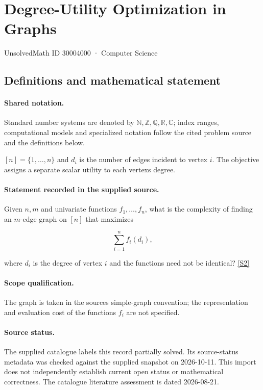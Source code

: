 \documentclass[11pt]{article}
\newcommand{\sref}[2]{\hyperlink{source:#1:#2}{[S#2]}}
\begin{document}
\setcounter{section}{30003999}
\section{Degree-Utility Optimization in Graphs}\label{30004000}
{\small\sffamily UnsolvedMath ID 30004000 · Computer Science}
\subsection{Definitions and mathematical statement}

\paragraph{Shared notation.}Standard number systems are denoted by $\mathbb N,\mathbb Z,\mathbb Q,\mathbb R,\mathbb C$; index ranges, computational models and specialized notation follow the cited problem source and the definitions below.


$[n]=\{1,\ldots,n\}$ and $d_i$ is the number of edges incident to vertex $i$. The objective assigns a separate scalar utility to each vertex\textquotesingle s degree.
\paragraph{Statement recorded in the supplied source.}
Given $n,m$ and univariate functions $f_1,\ldots,f_n$, what is the complexity of finding an $m$-edge graph on $[n]$ that maximizes

$$\sum_{i=1}^nf_i(d_i),$$

where $d_i$ is the degree of vertex $i$ and the functions need not be identical? \sref{30004000}{2}
\paragraph{Scope qualification.}
The graph is taken in the source\textquotesingle s simple-graph convention; the representation and evaluation cost of the functions $f_i$ are not specified.
\paragraph{Source status.}
The supplied catalogue labels this record partially solved. Its source-status metadata was checked against the supplied snapshot on 2026-10-11. This import does not independently establish current open status or mathematical correctness. The catalogue literature assessment is dated 2026-08-21.
\end{document}
